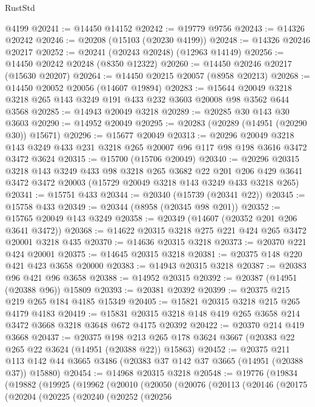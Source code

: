 \begin{lexlean}{RustStd}
\begin{coremodule}
    @4199
@20241 := @14450 @14152
@20242 := @19779 @9756
@20243 := @14326 @20242
@20246 := @20208 (@15103 (@20230 @4199))
@20248 := @14326 @20246 @20217
@20252 := @20241 (@20243 @20248) (@12963 @14149)
@20256 := @14450 @20242 @20248 (@8350 @12322)
@20260 := @14450 @20246 @20217 (@15630 @20207)
@20264 := @14450 @20215 @20057 (@8958 @20213)
@20268 := @14450 @20052 @20056 (@14607 @19894)
@20283 := @15644 @20049 @3218 @3218 @265 @143 @3249 @191 @433 @232 @3603 @20008 @98 @3562 @644 @3568
@20285 := @14943 @20049 @3218
@20289 := @20285 @30 @143 @30 @3603
@20290 := @14952 @20049
@20295 := @20283 (@20289 (@14951 (@20290 @30)) @15671)
@20296 := @15677 @20049
@20313 := @20296
    @20049
    @3218
    @143
    @3249
    @433
    @231
    @3218
    @265
    @20007
    @96
    @117
    @98
    @198
    @3616
    @3472
    @3472
    @3624
@20315 := @15700 (@15706 @20049)
@20340 := @20296
    @20315
    @3218
    @143
    @3249
    @433
    @98
    @3218
    @265
    @3682
    @22
    @201
    @206
    @429
    @3641
    @3472
    @3472
    @20003
    (@15729 @20049 @3218 @143 @3249 @433 @3218 @265)
@20341 := @15751 @433
@20344 := @20340 (@15739 (@20341 @22))
@20345 := @15758 @433
@20349 := @20344 (@8958 (@20345 @98 @201))
@20352 := @15765 @20049 @143 @3249
@20358 := @20349 (@14607 (@20352 @201 @206 @3641 @3472))
@20368 := @14622 @20315 @3218 @275 @221 @424 @265 @3472 @20001 @3218 @435
@20370 := @14636 @20315 @3218
@20373 := @20370 @221 @424 @20001
@20375 := @14645 @20315 @3218
@20381 := @20375 @148 @220 @421 @423 @3658 @20000
@20383 := @14943 @20315 @3218
@20387 := @20383 @96 @421 @96 @3658
@20388 := @14952 @20315
@20392 := @20387 (@14951 (@20388 @96)) @15809
@20393 := @20381 @20392
@20399 := @20375 @215 @219 @265 @184 @4185 @15349
@20405 := @15821 @20315 @3218 @215 @265 @4179 @4183
@20419 := @15831 @20315 @3218 @148 @419 @265 @3658 @214 @3472 @3668 @3218 @3648 @672 @4175 @20392
@20422 := @20370 @214 @419 @3668
@20437 := @20375
    @198
    @213
    @265
    @178
    @3624
    @3667
    (@20383 @22 @265 @22 @3624 (@14951 (@20388 @22)) @15863)
@20452 := @20375
    @211
    @113
    @142
    @44
    @3665
    @3486
    (@20383 @37 @142 @37 @3665 (@14951 (@20388 @37)) @15880)
@20454 := @14968 @20315 @3218
@20548 := @19776
    (@19834
      (@19882
        (@19925
          (@19962
            (@20010
              (@20050
                (@20076
                  (@20113
                    (@20146
                      (@20175
                        (@20204
                          (@20225
                            (@20240
                              (@20252
                                (@20256

\end{coremodule}
\end{lexlean}
